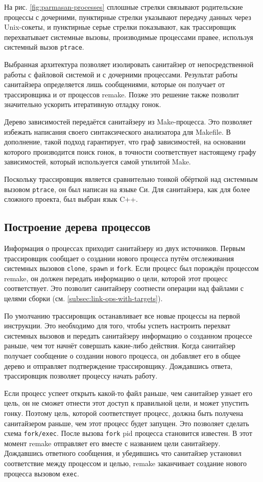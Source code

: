 На рис. \ref{fig:parmasan-processes} сплошные стрелки связывают родительские процессы с дочерними, пунктирные стрелки указывают передачу данных через Unix-сокеты, и пунктирные серые стрелки показывают, как трассировщик перехватывает системные вызовы, производимые процессами правее, используя системный вызов \texttt{ptrace}.

Выбранная архитектура позволяет изолировать санитайзер от непосредственной работы с файловой системой и с дочерними процессами. Результат работы санитайзера определяется лишь сообщениями, которые он получает от трассировщика и от процессов remake. Позже это решение также позволит значительно ускорить итеративную отладку гонок.

Дерево зависимостей передаётся санитайзеру из Make-процесса. Это позволяет избежать написания своего синтаксического анализатора для Makefile. В дополнение, такой подход гарантирует, что граф зависимостей, на основании которого производится поиск гонок, в точности соответствует настоящему графу зависимостей, который используется самой утилитой Make.

Поскольку трассировщик является сравнительно тонкой обёрткой над системным вызовом \texttt{ptrace}, он был написан на языке Си. Для санитайзера, как для более сложного проекта, был выбран язык C++.

\subsection{Построение дерева процессов}

Информация о процессах приходит санитайзеру из двух источников. Первым трассировщик сообщает о создании нового процесса путём отслеживания системных вызовов \texttt{clone}, \texttt{spawn} и \texttt{fork}. Если процесс был порождён процессом remake, он должен передать информацию о цели, которой этот процесс соответствует. Это позволит санитайзеру соотнести операции над файлами с целями сборки (см. \ref{subsec:link-ops-with-targets}).

По умолчанию трассировщик останавливает все новые процессы на первой инструкции. Это необходимо для того, чтобы успеть настроить перехват системных вызовов и передать санитайзеру информацию о созданном процессе раньше, чем тот начнёт совершать какие-либо действия. Когда санитайзер получает сообщение о создании нового процесса, он добавляет его в общее дерево и отправляет подтверждение трассировщику. Дождавшись ответа, трассировщик позволяет процессу начать работу.

Если процесс успеет открыть какой-то файл раньше, чем санитайзер узнает его цель, он не сможет отнести этот доступ к правильной цели, и может упустить гонку. Поэтому цель, которой соответствует процесс, должна быть получена санитайзером раньше, чем этот процесс будет запущен. Это позволяет сделать схема \texttt{fork/exec}. После вызова \texttt{fork} pid процесса становится известен. В этот момент remake отправляет его вместе с названием цели санитайзеру. Дождавшись ответного сообщения, и убедившись что санитайзер установил соответствие между процессом и целью, remake заканчивает создание нового процесса вызовом \texttt{exec}.

